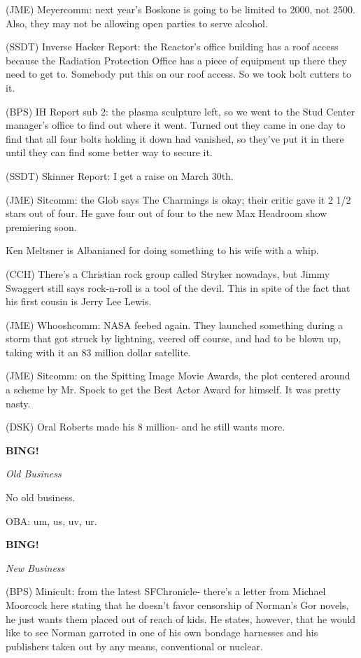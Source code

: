 \documentclass[12pt]{article}
\newcommand{\bing}{{\bf BING!} }
\newcommand{\goto}[1]{\bing \vskip 12pt \centerline{{\em{#1}}}}
\begin{document}
(JME) Meyercomm: next year's Boskone is going to be limited to 2000, not 2500. Also, they may not be allowing open parties to serve alcohol.

(SSDT) Inverse Hacker Report: the Reactor's office building has a roof access because the Radiation Protection Office has a piece of equipment up there they need to get to. Somebody put this on our roof access. So we took bolt cutters to it.

(BPS) IH Report sub 2: the plasma sculpture left, so we went to the Stud Center manager's office to find out where it went. Turned out they came in one day to find that all four bolts holding it down had vanished, so they've put it in there until they can find some better way to secure it.

(SSDT) Skinner Report: I get a raise on March 30th.

(JME) Sitcomm: the Glob says The Charmings is okay; their critic gave it 2 1/2 stars out of four. He gave four out of four to the new Max Headroom show premiering soon.

Ken Meltsner is Albanianed for doing something to his wife with a whip.

(CCH) There's a Christian rock group called Stryker nowadays, but Jimmy Swaggert still says rock-n-roll is a tool of the devil. This in spite of the fact that his first cousin is Jerry Lee Lewis.

(JME) Whooshcomm: NASA feebed again. They launched something during a storm that got struck by lightning, veered off course, and had to be blown up, taking with it an 83 million dollar satellite.

(JME) Sitcomm: on the Spitting Image Movie Awards, the plot centered around a scheme by Mr. Spock to get the Best Actor Award for himself. It was pretty nasty.

(DSK) Oral Roberts made his 8 million- and he still wants more.

\goto{Old Business}

No old business.

OBA: um, us, uv, ur.

\goto{New Business}

(BPS) Minicult: from the latest SFChronicle- there's a letter from Michael Moorcock here stating that he doesn't favor censorship of Norman's Gor novels, he just wants them placed out of reach of kids. He states, however, that he would like to see Norman garroted in one of his own bondage harnesses and his publishers taken out by any means, conventional or nuclear.
\end{document}
